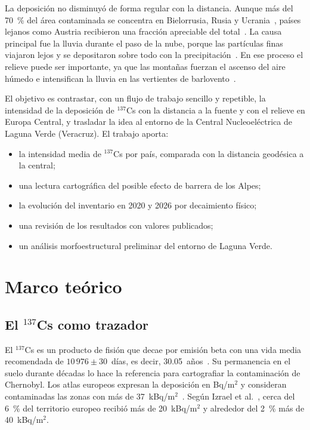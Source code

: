La deposici\'on no disminuy\'o de forma regular con la distancia. Aunque m\'as del 70~\% del \'area contaminada se concentra en Bielorrusia, Rusia y Ucrania~\cite{iaea2006}, pa\'ises lejanos como Austria recibieron una fracci\'on apreciable del total~\cite{izrael1996}. La causa principal fue la lluvia durante el paso de la nube, porque las part\'iculas finas viajaron lejos y se depositaron sobre todo con la precipitaci\'on~\cite{oecd2002}. En ese proceso el relieve puede ser importante, ya que las monta\~nas fuerzan el ascenso del aire h\'umedo e intensifican la lluvia en las vertientes de barlovento~\cite{garcia2003}.

El objetivo es contrastar, con un flujo de trabajo sencillo y repetible, la intensidad de la deposici\'on de $^{137}$Cs con la distancia a la fuente y con el relieve en Europa Central, y trasladar la idea al entorno de la Central Nucleoel\'ectrica de Laguna Verde (Veracruz). El trabajo aporta:
\begin{itemize}
\item la intensidad media de $^{137}$Cs por pa\'is, comparada con la distancia geod\'esica a la central;
\item una lectura cartogr\'afica del posible efecto de barrera de los Alpes;
\item la evoluci\'on del inventario en 2020 y 2026 por decaimiento f\'isico;
\item una revisi\'on de los resultados con valores publicados;
\item un an\'alisis morfoestructural preliminar del entorno de Laguna Verde.
\end{itemize}

\section{Marco te\'orico}
\subsection{El $^{137}$Cs como trazador}
El $^{137}$Cs es un producto de fisi\'on que decae por emisi\'on beta con una vida media recomendada de $10\,976\pm30$~d\'ias, es decir, 30.05~a\~nos~\cite{pearce2008}. Su permanencia en el suelo durante d\'ecadas lo hace la referencia para cartografiar la contaminaci\'on de Chernobyl. Los atlas europeos expresan la deposici\'on en Bq/m$^2$ y consideran contaminadas las zonas con m\'as de 37~kBq/m$^2$~\cite{iaea2006}. Seg\'un Izrael et al.~\cite{izrael1996}, cerca del 6~\% del territorio europeo recibi\'o m\'as de 20~kBq/m$^2$ y alrededor del 2~\% m\'as de 40~kBq/m$^2$.

